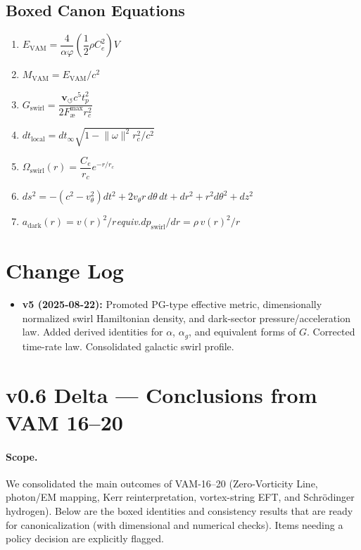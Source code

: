 \documentclass[11pt,a4paper]{article}
\newcommand{\aeether}{\text{\ae}} %
\begin{document}
    \subsection{Boxed Canon Equations}
    \begin{enumerate}
        \item $\boxed{E_{\mathrm{VAM}} = \dfrac{4}{\alpha\varphi}\left(\dfrac{1}{2}\rho C_e^2\right)V}$
        \item $\boxed{M_{\mathrm{VAM}} = E_{\mathrm{VAM}}/c^2}$
        \item $\boxed{G_{\mathrm{swirl}} = \dfrac{\mathbf{v}_{\scriptscriptstyle\boldsymbol{\circlearrowleft}} c^5 t_p^2}{2F_{\aeether}^{\max} r_c^2}}$
        \item $\boxed{dt_{\mathrm{local}} = dt_{\infty}\sqrt{1-\lVert\omega\rVert^{2} r_c^{2}/c^2}}$
        \item $\boxed{\Omega_{\mathrm{swirl}}(r) = \dfrac{C_e}{r_c}e^{-r/r_c}}$
        \item $\boxed{ds^2 = -(c^2 - v_\theta^2)dt^2 + 2 v_\theta r\,d\theta\,dt + dr^2 + r^2 d\theta^2 + dz^2}$
        \item $\boxed{a_{\mathrm{dark}}(r)=v(r)^2/r}$\quad\emph{equiv.}\quad$\boxed{dp_{\mathrm{swirl}}/dr=\rho\,v(r)^2/r}$
    \end{enumerate}

    \section*{Change Log}
    \begin{itemize}
        \item \textbf{v5 (2025-08-22):} Promoted PG-type effective metric, dimensionally normalized swirl Hamiltonian density, and dark-sector pressure/acceleration law. Added derived identities for $\alpha$, $\alpha_g$, and equivalent forms of $G$. Corrected time-rate law. Consolidated galactic swirl profile.
    \end{itemize}




    \section*{v0.6 Delta — Conclusions from VAM 16–20}
    \label{sec:v06-delta}

    \paragraph{Scope.}
    We consolidated the main outcomes of VAM-16–20 (Zero-Vorticity Line, photon/EM mapping, Kerr reinterpretation, vortex-string EFT, and Schr\"odinger hydrogen). Below are the boxed identities and consistency results that are ready for canonicalization (with dimensional and numerical checks). Items needing a policy decision are explicitly flagged.
\end{document}
